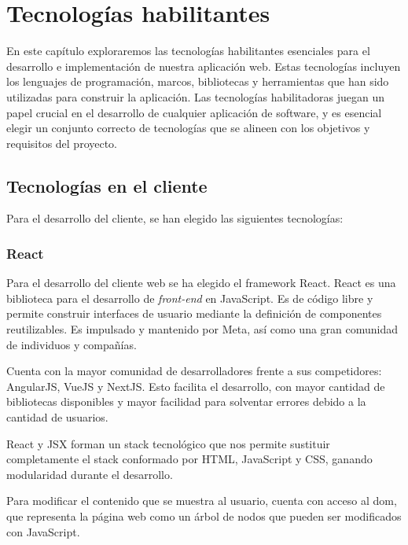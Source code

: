 \chapter{Tecnologías habilitantes}
\label{chap:enabling_technologies}


En este capítulo exploraremos las tecnologías habilitantes esenciales para el desarrollo e implementación de nuestra aplicación web. Estas tecnologías incluyen los lenguajes de programación, marcos, bibliotecas y herramientas que han sido utilizadas para construir la aplicación. Las tecnologías habilitadoras juegan un papel crucial en el desarrollo de cualquier aplicación de software, y es esencial elegir un conjunto correcto de tecnologías que se alineen con los objetivos y requisitos del proyecto.

\section{Tecnologías en el cliente}
\label{tec_hab:client}

Para el desarrollo del cliente, se han elegido las siguientes tecnologías:

\subsection{React}
\label{tec_hab:react}


Para el desarrollo del cliente web se ha elegido el framework React. React es una biblioteca para el desarrollo de \textit{front-end} en JavaScript. Es de código libre y permite construir interfaces de usuario mediante la definición de componentes reutilizables. Es impulsado y mantenido por Meta, así como una gran comunidad de individuos y compañías.

Cuenta con la mayor comunidad de desarrolladores frente a sus competidores: AngularJS, VueJS y NextJS. Esto facilita el desarrollo, con mayor cantidad de bibliotecas disponibles y mayor facilidad para solventar errores debido a la cantidad de usuarios.

React y JSX forman un stack tecnológico que nos permite sustituir completamente el stack conformado por HTML, JavaScript y CSS, ganando modularidad durante el desarrollo.

Para modificar el contenido que se muestra al usuario, cuenta con acceso al \acrshort{dom}, que representa la página web como un árbol de nodos que pueden ser modificados con JavaScript.

